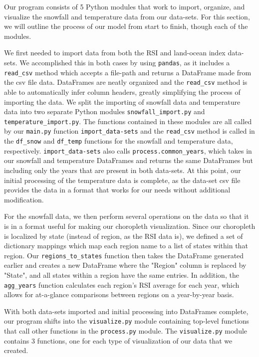 \documentclass[fontsize=11pt]{article}
\begin{document}
Our program consists of 5 Python modules that work to import, organize, and visualize the snowfall and temperature data from our data-sets. For this section, we will outline the process of our model from start to finish, though each of the modules.

We first needed to import data from both the RSI and land-ocean index data-sets. We accomplished this in both cases by using \texttt{pandas}, as it includes a \texttt{read\_csv} method which accepts a file-path and returns a DataFrame made from the csv file data. DataFrames are neatly organized and the \texttt{read\_csv} method is able to automatically infer column headers, greatly simplifying the process of importing the data. We split the importing of snowfall data and temperature data into two separate Python modules \texttt{snowfall\_import.py} and \texttt{temperature\_import.py}. The functions contained in these modules are all called by our \texttt{main.py} function \texttt{import\_data-sets} and the \texttt{read\_csv} method is called in the \texttt{df\_snow} and \texttt{df\_temp} functions for the snowfall and temperature data, respectively. \texttt{import\_data-sets} also calls \texttt{process.common\_years}, which takes in our snowfall and temperature DataFrames and returns the same DataFrames but including only the years that are present in both data-sets. At this point, our initial processing of the temperature data is complete, as the data-set csv file provides the data in a format that works for our needs without additional modification.

For the snowfall data, we then perform several operations on the data so that it is in a format useful for making our choropleth visualization. Since our choropleth is localized by state (instead of region, as the RSI data is), we defined a set of dictionary mappings which map each region name to a list of states within that region. Our \texttt{regions\_to\_states} function then takes the DataFrame generated earlier and creates a new DataFrame where the "Region" column is replaced by "State", and all states within a region have the same entries. In addition, the \texttt{agg\_years} function calculates each region's RSI average for each year, which allows for at-a-glance comparisons between regions on a year-by-year basis.

With both data-sets imported and initial processing into DataFrames complete, our program shifts into the \texttt{visualize.py} module containing top-level functions that call other functions in the \texttt{process.py} module. The \texttt{visualize.py} module contains 3 functions, one for each type of visualization of our data that we created.
\end{document}
